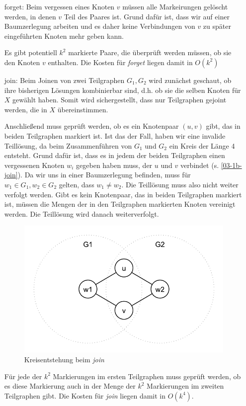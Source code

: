 \begin{itemize}
\item[forget: ]Beim vergessen eines Knoten $v$ müssen alle Markeirungen gelöscht werden, in denen $v$ Teil des Paares ist. Grund dafür ist, dass wir auf einer Baumzerlegung arbeiten und es daher keine Verbindungen von $v$ zu später eingeführten Knoten mehr geben kann.

Es gibt potentiell $k^2$ markierte Paare, die überprüft werden müssen, ob sie den Knoten $v$ enthalten. Die Kosten für \textit{forget} liegen damit in $O(k^2)$

\item[join: ] Beim Joinen von zwei Teilgraphen $G_1, G_2$ wird zunächst geschaut, ob ihre bisherigen Lösungen kombinierbar sind, d.h. ob sie die selben Knoten für $X$ gewählt haben. Somit wird sichergestellt, dass nur Teilgraphen gejoint werden, die in $X$ übereinstimmen.

Anschließend muss geprüft werden, ob es ein Knotenpaar $(u,v)$ gibt, das in beiden Teilgraphen markiert ist. Ist das der Fall, haben wir eine invalide Teillösung, da beim Zusammenführen von $G_1$ und $G_2$ ein Kreis der Länge 4 entsteht. Grund dafür ist, dass es in jedem der beiden Teilgraphen einen vergessenen Knoten $w_i$ gegeben haben muss, der $u$ und $v$ verbindet (s. \autoref{03-1b-join}). Da wir uns in einer Baumzerlegung befinden, muss für $w_1\in G_1, w_2\in G_2$ gelten, dass $w_1\neq w_2$. Die Teillösung muss also nicht weiter verfolgt werden. Gibt es kein Knotenpaar, das in beiden Teilgraphen markiert ist, müssen die Mengen der in den Teilgraphen markierten Knoten vereinigt werden. Die Teillösung wird danach weiterverfolgt.

\begin{figure}[h]
	\center		
	\includegraphics[scale=0.5]{fig/03-1b-join}
	\caption{Kreisentstehung beim \textit{join}}
	\label{03-1b-join}
\end{figure}

Für jede der $k^2$ Markierungen im ersten Teilgraphen muss geprüft werden, ob es diese Markierung auch in der Menge der $k^2$ Markierungen im zweiten Teilgraphen gibt. Die Kosten für \textit{join} liegen damit in $O(k^4)$.
\end{itemize}

